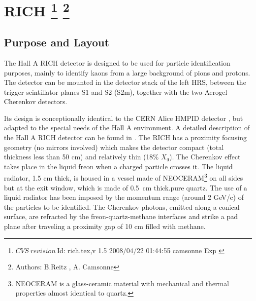 \chapter[RICH]{RICH
\label{sec:rich}
\footnote{
  $CVS~revision~ $Id: rich.tex,v 1.5 2008/04/22 01:44:55 camsonne Exp $ $
}
\footnote{Authors: B.Reitz , A. Camsonne }
}

\section{Purpose and Layout} 

The Hall A RICH detector is designed to be used for particle identification purposes, mainly 
to identify kaons from a large background of pions and protons. The detector can be mounted in
the detector stack of the left HRS, between the trigger scintillator planes S1 and S2 (S2m),
together with the two Aerogel Cherenkov detectors.

Its design is conceptionally identical 
to the CERN Alice HMPID detector \cite{Beole:1998yq}, but adapted to the special needs
of the Hall A environment.
A detailed description of the Hall A RICH detector can be found in \cite{hallarep02}.
The RICH has a proximity focusing geometry (no mirrors involved) which makes the 
detector compact (total thickness less than 50 cm) and relatively thin (18\% $X_0$).
The Cherenkov effect takes place in the liquid freon 
when a charged particle 
crosses it.
The liquid radiator, 1.5 cm thick, 
is housed in a vessel made of NEOCERAM\footnote{NEOCERAM is
a glass-ceramic material with mechanical and thermal properties
almost identical to quartz.}    
on all sides but
at the exit window, which is made of 0.5~cm thick.pure quartz.  
The use of a liquid radiator has been imposed by the momentum range (around
 2 GeV/c) of the particles to be identified.
The Cherenkov photons, emitted along a conical surface,
are refracted by the 
freon-quartz-methane interfaces and strike 
a pad plane after traveling a proximity gap 
of 10 cm filled with methane.


